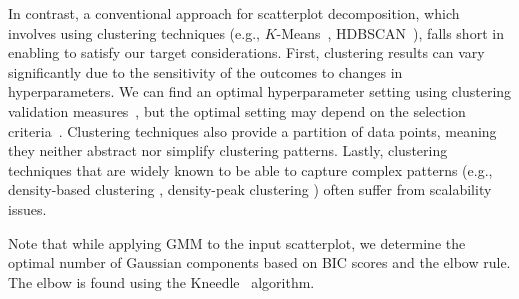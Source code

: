 In contrast, a conventional approach for scatterplot decomposition, which involves using clustering techniques (e.g., $K$-Means~\cite{likas03pr}, HDBSCAN~\cite{mcinnes17icdmw}), falls short in enabling \measure to satisfy our target considerations.
First, clustering results can vary significantly due to the sensitivity of the outcomes to changes in hyperparameters. We can find an optimal hyperparameter setting using clustering validation measures~\cite{xiong2018clustering}, but the optimal setting may depend on the selection criteria~\cite{liu10icdm}. Clustering techniques also provide a partition of data points, meaning they neither abstract nor simplify clustering patterns. Lastly, clustering techniques that are widely known to be able to capture complex patterns (e.g., density-based clustering \cite{mcinnes17icdmw}, density-peak clustering \cite{liu18is}) often suffer from scalability issues.


Note that while applying GMM to the input scatterplot, we determine the optimal number of Gaussian components based on BIC scores and the elbow rule. The elbow is found using the Kneedle~\cite{satopaa11icdcsw} algorithm.



